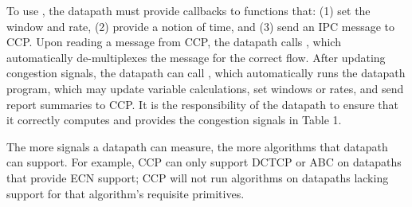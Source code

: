 To use , the datapath must provide callbacks to functions that: (1) set the window and rate, (2) provide a notion of time, and (3) send an IPC message to CCP. Upon reading a message from CCP, the datapath calls , which automatically de-multiplexes the message for the correct flow. After updating congestion signals, the datapath can call , which automatically runs the datapath program, which may update variable calculations, set windows or rates, and send report summaries to CCP. It is the responsibility of the datapath to ensure that it correctly computes and provides the congestion signals in Table 1.

The more signals a datapath can measure, the more algorithms that datapath can support. For example, CCP can only support DCTCP \cite{DCTCP} or ABC \cite{abc} on datapaths that provide ECN support; CCP will not run algorithms on datapaths lacking support for that algorithm’s requisite primitives.
